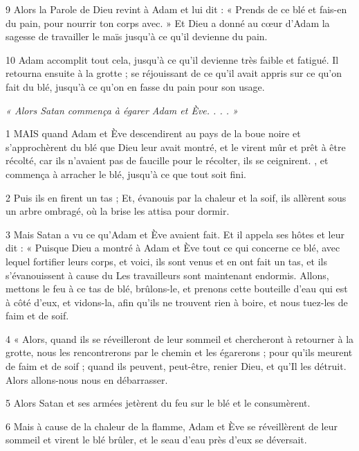 \par 9 Alors la Parole de Dieu revint à Adam et lui dit : « Prends de ce blé et fais-en du pain, pour nourrir ton corps avec. » Et Dieu a donné au cœur d'Adam la sagesse de travailler le maïs jusqu'à ce qu'il devienne du pain.

\par 10 Adam accomplit tout cela, jusqu'à ce qu'il devienne très faible et fatigué. Il retourna ensuite à la grotte ; se réjouissant de ce qu'il avait appris sur ce qu'on fait du blé, jusqu'à ce qu'on en fasse du pain pour son usage.


\par \textit{« Alors Satan commença à égarer Adam et Ève. . . . »}

\par 1 MAIS quand Adam et Ève descendirent au pays de la boue noire et s'approchèrent du blé que Dieu leur avait montré, et le virent mûr et prêt à être récolté, car ils n'avaient pas de faucille pour le récolter, ils se ceignirent. , et commença à arracher le blé, jusqu'à ce que tout soit fini.

\par 2 Puis ils en firent un tas ; Et, évanouis par la chaleur et la soif, ils allèrent sous un arbre ombragé, où la brise les attisa pour dormir.

\par 3 Mais Satan a vu ce qu'Adam et Ève avaient fait. Et il appela ses hôtes et leur dit : « Puisque Dieu a montré à Adam et Ève tout ce qui concerne ce blé, avec lequel fortifier leurs corps, et voici, ils sont venus et en ont fait un tas, et ils s'évanouissent à cause du Les travailleurs sont maintenant endormis. Allons, mettons le feu à ce tas de blé, brûlons-le, et prenons cette bouteille d'eau qui est à côté d'eux, et vidons-la, afin qu'ils ne trouvent rien à boire, et nous tuez-les de faim et de soif.

\par 4 « Alors, quand ils se réveilleront de leur sommeil et chercheront à retourner à la grotte, nous les rencontrerons par le chemin et les égarerons ; pour qu'ils meurent de faim et de soif ; quand ils peuvent, peut-être, renier Dieu, et qu'Il les détruit. Alors allons-nous nous en débarrasser.

\par 5 Alors Satan et ses armées jetèrent du feu sur le blé et le consumèrent.

\par 6 Mais à cause de la chaleur de la flamme, Adam et Ève se réveillèrent de leur sommeil et virent le blé brûler, et le seau d'eau près d'eux se déversait.

